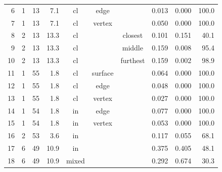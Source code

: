 \begin{table}[h]
\begin{tabular}{rrrrcccccr}
 6 &     1 &    13 &  7.1  & cl    & edge    &          & 0.013 & 0.000 & 100.0\\ %
 7 &     1 &    13 &  7.1  & cl    & vertex  &          & 0.050 & 0.000 & 100.0\\ %
 8 &     2 &    13 & 13.3  & cl    &         & closest  & 0.101 & 0.151 &  40.1\\ %
 9 &     2 &    13 & 13.3  & cl    &         & middle   & 0.159 & 0.008 &  95.4\\ %
10 &     2 &    13 & 13.3  & cl    &         & furthest & 0.159 & 0.002 &  98.9\\ %
11 &     1 &    55 &  1.8  & cl    & surface &          & 0.064 & 0.000 & 100.0\\ %
12 &     1 &    55 &  1.8  & cl    & edge    &          & 0.048 & 0.000 & 100.0\\ %
13 &     1 &    55 &  1.8  & cl    & vertex  &          & 0.027 & 0.000 & 100.0\\ %
14 &     1 &    54 &  1.8  & in    & edge    &          & 0.077 & 0.000 & 100.0\\ %
15 &     1 &    54 &  1.8  & in    & vertex  &          & 0.053 & 0.000 & 100.0\\ %
16 &     2 &    53 &  3.6  & in    &         &          & 0.117 & 0.055 &  68.1\\ %
17 &     6 &    49 & 10.9  & in    &         &          & 0.375 & 0.405 &  48.1\\ %
18 &     6 &    49 & 10.9  & mixed &         &          & 0.292 & 0.674 &  30.3\\ %

\end{tabular}
\end{table}
